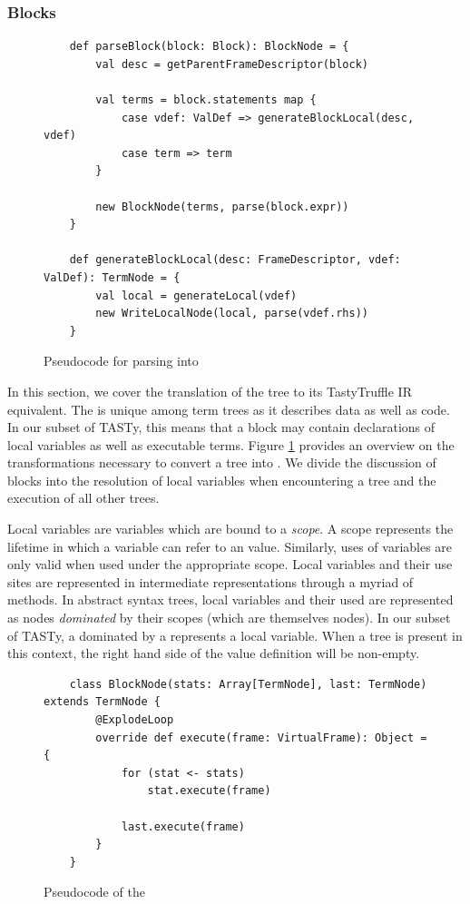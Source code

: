 \subsubsection*{Blocks}

\begin{figure}[!htb]
	\begin{verbatim}
	def parseBlock(block: Block): BlockNode = {
		val desc = getParentFrameDescriptor(block)
			
		val terms = block.statements map {
			case vdef: ValDef => generateBlockLocal(desc, vdef)
			case term => term 
		}
			
		new BlockNode(terms, parse(block.expr))
	}
		
	def generateBlockLocal(desc: FrameDescriptor, vdef: ValDef): TermNode = {
		val local = generateLocal(vdef)
		new WriteLocalNode(local, parse(vdef.rhs))
	}	
	\end{verbatim}
	\caption{Pseudocode for parsing  into }
	\label{impl:parse-block}
\end{figure}

In this section, we cover the translation of the  tree to its TastyTruffle IR equivalent.
The  is unique among term trees as it describes data as well as code.
In our subset of TASTy, this means that a block may contain declarations of local variables as well as executable terms.
Figure \ref{impl:parse-block} provides an overview on the transformations necessary to convert a  tree into .
We divide the discussion of blocks into the resolution of local variables when encountering a  tree and the execution of all other trees.

Local variables are variables which are bound to a \textit{scope}. 
A scope represents the lifetime in which a variable can refer to an value. 
Similarly, uses of variables are only valid when used under the appropriate scope. 
Local variables and their use sites are represented in intermediate representations through a myriad of methods. 
In abstract syntax trees, local variables and their used are represented as nodes \textit{dominated} by their scopes (which are themselves nodes). 
In our subset of TASTy, a  dominated by a  represents a local variable.
When a  tree is present in this context, the right hand side of the value definition will be non-empty.

\begin{figure}[!htb]
	\begin{verbatim}
	class BlockNode(stats: Array[TermNode], last: TermNode) extends TermNode {
		@ExplodeLoop
		override def execute(frame: VirtualFrame): Object = {
			for (stat <- stats) 
				stat.execute(frame)
					
			last.execute(frame)
		}
	}
	\end{verbatim}
	\caption{Pseudocode of the }
	\label{impl:block-node}
\end{figure}

